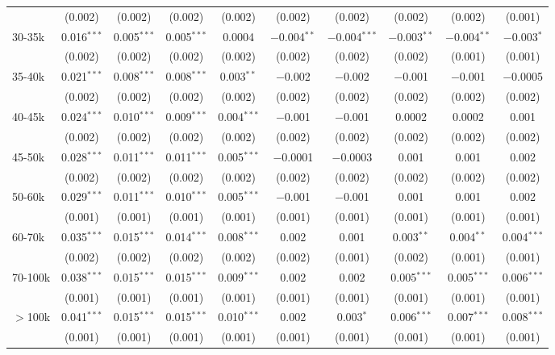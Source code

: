 \begin{table}[!htbp]
{\begin{tabular}{@{\extracolsep{5pt}}lccccccccc}
  & (0.002) & (0.002) & (0.002) & (0.002) & (0.002) & (0.002) & (0.002) & (0.002) & (0.001) \\
  30-35k & 0.016$^{***}$ & 0.005$^{***}$ & 0.005$^{***}$ & 0.0004 & $-$0.004$^{**}$ & $-$0.004$^{***}$ & $-$0.003$^{**}$ & $-$0.004$^{**}$ & $-$0.003$^{*}$ \\
  & (0.002) & (0.002) & (0.002) & (0.002) & (0.002) & (0.002) & (0.002) & (0.001) & (0.001) \\
  35-40k & 0.021$^{***}$ & 0.008$^{***}$ & 0.008$^{***}$ & 0.003$^{**}$ & $-$0.002 & $-$0.002 & $-$0.001 & $-$0.001 & $-$0.0005 \\
  & (0.002) & (0.002) & (0.002) & (0.002) & (0.002) & (0.002) & (0.002) & (0.002) & (0.002) \\
  40-45k & 0.024$^{***}$ & 0.010$^{***}$ & 0.009$^{***}$ & 0.004$^{***}$ & $-$0.001 & $-$0.001 & 0.0002 & 0.0002 & 0.001 \\
  & (0.002) & (0.002) & (0.002) & (0.002) & (0.002) & (0.002) & (0.002) & (0.002) & (0.002) \\
  45-50k & 0.028$^{***}$ & 0.011$^{***}$ & 0.011$^{***}$ & 0.005$^{***}$ & $-$0.0001 & $-$0.0003 & 0.001 & 0.001 & 0.002 \\
  & (0.002) & (0.002) & (0.002) & (0.002) & (0.002) & (0.002) & (0.002) & (0.002) & (0.002) \\
  50-60k & 0.029$^{***}$ & 0.011$^{***}$ & 0.010$^{***}$ & 0.005$^{***}$ & $-$0.001 & $-$0.001 & 0.001 & 0.001 & 0.002 \\
  & (0.001) & (0.001) & (0.001) & (0.001) & (0.001) & (0.001) & (0.001) & (0.001) & (0.001) \\
  60-70k & 0.035$^{***}$ & 0.015$^{***}$ & 0.014$^{***}$ & 0.008$^{***}$ & 0.002 & 0.001 & 0.003$^{**}$ & 0.004$^{**}$ & 0.004$^{***}$ \\
  & (0.002) & (0.002) & (0.002) & (0.002) & (0.002) & (0.001) & (0.002) & (0.001) & (0.001) \\
  70-100k & 0.038$^{***}$ & 0.015$^{***}$ & 0.015$^{***}$ & 0.009$^{***}$ & 0.002 & 0.002 & 0.005$^{***}$ & 0.005$^{***}$ & 0.006$^{***}$ \\
  & (0.001) & (0.001) & (0.001) & (0.001) & (0.001) & (0.001) & (0.001) & (0.001) & (0.001) \\
  $>$100k & 0.041$^{***}$ & 0.015$^{***}$ & 0.015$^{***}$ & 0.010$^{***}$ & 0.002 & 0.003$^{*}$ & 0.006$^{***}$ & 0.007$^{***}$ & 0.008$^{***}$ \\
  & (0.001) & (0.001) & (0.001) & (0.001) & (0.001) & (0.001) & (0.001) & (0.001) & (0.001) \\

\end{tabular}}
\end{table}
